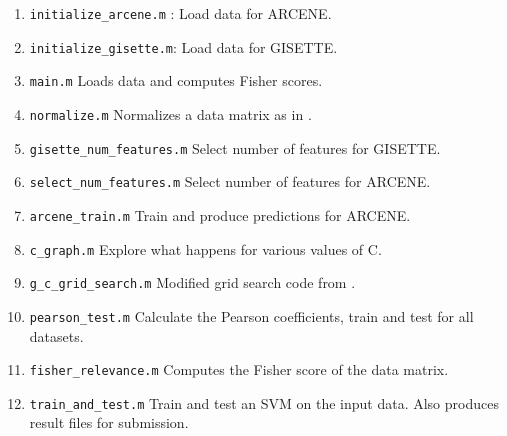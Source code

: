 \documentclass[12pt,a4paper,twocolumn]{article}
\begin{document}
\begin{enumerate}
\item \texttt{initialize\_arcene.m} : Load data for ARCENE.
\item \texttt{initialize\_gisette.m}: Load data for GISETTE.
\item \texttt{main.m} Loads data and computes Fisher scores.
\item \texttt{normalize.m} Normalizes a data matrix as in \citep{filter_svms}.
\item \texttt{gisette\_num\_features.m} Select number of features for GISETTE.
\item \texttt{select\_num\_features.m} Select number of features for ARCENE.
\item \texttt{arcene\_train.m} Train and produce predictions for ARCENE.
\item \texttt{c\_graph.m} Explore what happens for various values of C.
\item \texttt{g\_c\_grid\_search.m} Modified grid search code from  \citep{website:kitipat_heatmap}.
\item \texttt{pearson\_test.m} Calculate the Pearson coefficients, train and test for all datasets.
\item \texttt{fisher\_relevance.m} Computes the Fisher score of the data matrix.
\item \texttt{train\_and\_test.m} Train and test an SVM on the input data. Also produces result files for submission.



\end{enumerate}
\end{document}
